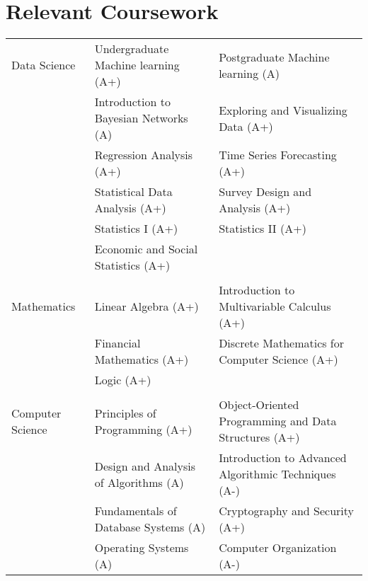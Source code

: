 \documentclass[10pt, oneside]{article}
\begin{document}
\section*{Relevant Coursework}
\begin{tabularx}{\linewidth}{p{2.8cm}|p{7cm} p{9cm}}
	\toprule 
	Data Science
	&
	Undergraduate Machine learning (A+) & Postgraduate Machine learning (A)\\
	&
	Introduction to Bayesian Networks (A) & Exploring and Visualizing Data (A+)\\
	&
	Regression Analysis (A+) & Time Series Forecasting (A+)\\
	&
	Statistical Data Analysis (A+) & Survey Design and Analysis (A+)\\	
	&
	Statistics I (A+) & Statistics II (A+) \\
	&
	Economic and Social Statistics (A+) 
	\\\\
	Mathematics &
	Linear Algebra (A+) & Introduction to Multivariable Calculus (A+)\\
	& Financial Mathematics (A+) & Discrete Mathematics for Computer Science (A+)\\
	& Logic (A+)
	\\\\
	Computer Science
	&
	Principles of Programming (A+) & Object-Oriented Programming and Data Structures (A+)\\
	& Design and Analysis of Algorithms (A) & Introduction to Advanced Algorithmic Techniques (A-)\\
	& Fundamentals of Database Systems (A) & Cryptography and Security (A+)\\
	& Operating Systems (A) & Computer Organization (A-)\\
\end{tabularx}
\end{document}
